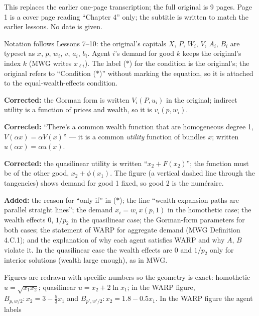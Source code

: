 \documentclass[11pt]{article}
\begin{document}
\begin{transcriptnotes}
  \item This replaces the earlier one-page transcription; the full original is
        9 pages. Page 1 is a cover page reading ``Chapter 4'' only; the subtitle
        is written to match the earlier lessons. No date is given.
  \item Notation follows Lessons 7--10: the original's capitals $X$, $P$, $W_i$,
        $V$, $A_i$, $B_i$ are typeset as $x$, $p$, $w_i$, $v$, $a_i$, $b_i$.
        Agent $i$'s demand for good $k$ keeps the original's index $k$ (MWG
        writes $x_{\ell i}$). The label ($*$) for the condition is the
        original's; the original refers to ``Condition ($*$)'' without marking
        the equation, so it is attached to the equal-wealth-effects condition.
  \item \textbf{Corrected:} the Gorman form is written $V_i(P,u_i)$ in the
        original; indirect utility is a function of prices and wealth, so it is
        $v_i(p,w_i)$.
  \item \textbf{Corrected:} ``There's a common wealth function that are
        homogeneous degree 1, $V(\alpha x)=\alpha V(x)$'' --- it is a common
        \emph{utility} function of bundles $x$; written $u(\alpha x)=\alpha
        u(x)$.
  \item \textbf{Corrected:} the quasilinear utility is written ``$x_2+F(x_2)$'';
        the function must be of the other good, $x_2+\phi(x_1)$. The figure (a
        vertical dashed line through the tangencies) shows demand for good 1
        fixed, so good 2 is the num\'eraire.
  \item \textbf{Added:} the reason for ``only if'' in ($*$); the line ``wealth
        expansion paths are parallel straight lines''; the demand
        $x_i=w_i\,x(p,1)$ in the homothetic case; the wealth effects $0$, $1/p_2$
        in the quasilinear case; the Gorman-form parameters for both cases; the
        statement of WARP for aggregate demand (MWG Definition 4.C.1); and the
        explanation of why each agent satisfies WARP and why $A$, $B$ violate it.
        In the quasilinear case the wealth effects are $0$ and $1/p_2$ only for
        interior solutions (wealth large enough), as in MWG.
  \item Figures are redrawn with specific numbers so the geometry is exact:
        homothetic $u=\sqrt{x_1x_2}$; quasilinear $u=x_2+2\ln x_1$; in the WARP
        figure, $B_{p,w/2}\colon x_2=3-\tfrac53x_1$ and
        $B_{p',w'/2}\colon x_2=1.8-0.5x_1$. In the WARP figure the agent labels

\end{transcriptnotes}
\end{document}
